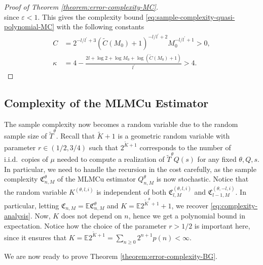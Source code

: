 \documentclass[11pt]{article}
\numberwithin{equation}{section}
\theoremstyle{definition}
\theoremstyle{remark}
\begin{document}
\begin{proof}[Proof of Theorem \ref{theorem:error-complexity-MC}]
\[    \]
    since $\varepsilon < 1$.
    This gives the  complexity bound \eqref{eq:sample-complexity-quasi-polynomial-MC} with the following constants
    \begin{equation}
        \label{eq:constants-K-kappa1-kappa2}
        \begin{aligned}
            C &= 2^{-l/l^\prime + 3}(\tilde{C}(M_0)+1)^{-l / l^\prime + 2}M_0^{-l / l^\prime + 1} > 0, \\
            \kappa & = 4 - \frac{2l + \log 2 + \log M_0 + \log (\tilde{C}(M_0) + 1)}{l^\prime} > 4.
        \end{aligned}
    \end{equation}
\end{proof}



\subsection{Complexity of the MLMCu Estimator}
\label{subsection:specialsing-complexity-BG}
The sample complexity now becomes a random variable due to the random sample size of $\tilde{T}^\theta$. Recall that $\tilde{K} + 1$ is a geometric random variable with parameter $r \in (1/2,3/4)$ such that $2^{\tilde K + 1}$ corresponds to the number of i.i.d.~copies of $\mu$ needed to compute a realization of $\tilde{T}^\theta Q (s)$ for any fixed $\theta,Q,s$. In particular, we need to handle the recursion in the cost carefully, as the sample complexity $\mathfrak C^\theta_{n,M}$ of the MLMCu estimator $Q^\theta_{n,M}$ is now stochastic.
Notice that the random variable $K^{(\theta,l,i)}$ is independent of both $\mathfrak C^{(\theta,l,i)} _{l,M}$ and $\mathfrak C ^{(\theta,-l,i)}_{l-1,M}$. In particular, letting $\mathfrak C_{n,M} = \mathbb E \mathfrak C^\theta_{n,M}$ and $K = \mathbb E 2^{\tilde K ^\theta + 1} + 1$, we recover \eqref{eq:complexity-analysis}. Now, $K$ does not depend on $n$, hence we get a polynomial bound in expectation. Notice how the choice of the parameter $r > 1/2$ is important here, since it ensures that $K = \mathbb E 2^{\tilde K + 1} = \sum_{n \geq 0}2^{n + 1}p(n) < \infty$.  

We are now ready to prove Theorem \ref{theorem:error-complexity-BG}.
\end{document}
